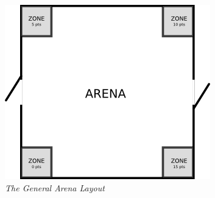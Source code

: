 \begin {figure}[h]
\begin {center}
\includegraphics[keepaspectratio, scale =1]{../arena/arenagame3.png}
\caption{\small{\emph{The General Arena Layout}}}
\label {fig:arena}
\end {center}
\end {figure}
